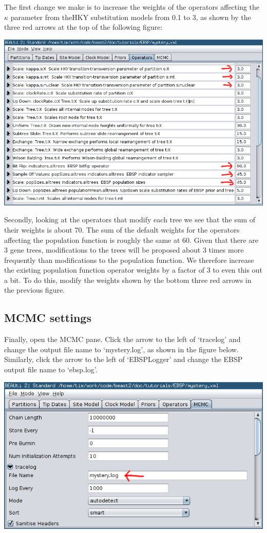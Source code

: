 \documentclass[a4paper,11pt]{article}
\begin{document}
The first change we make is to increase the weights of the operators affecting
the $\kappa$ parameter from theHKY substitution models from 0.1 to 3, as shown
by the three red arrows at the top of the following figure:

\includegraphics[width=\textwidth]{figures/operators.png}

Secondly, looking at the operators that modify each tree we see that the sum of
their weights is about 70. The sum of the default weights for the operators
affecting the population function is roughly the same at 60. Given that there
are 3 gene trees, modifications to the trees will be proposed about 3 times
more frequently than modifications to the population function.  We therefore
increase the existing population function operator weights by a factor of 3 to
even this out a bit.  To do this, modify the weights shown by the bottom three
red arrows in the previous figure.

\subsection{MCMC settings}

Finally, open the \textsc{MCMC} pane. Click the arrow to the left of `tracelog'
and change the output file name to `mystery.log', as shown in the figure below.
Similarly, click the arrow to the left of `EBSPLogger' and change the EBSP
output file name to `ebsp.log'.

    \includegraphics[width=\textwidth]{figures/mcmc_panel.png}
\end{document}
